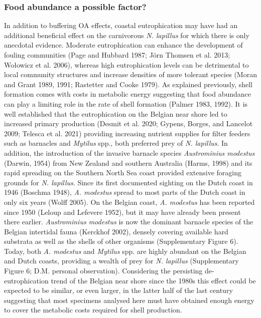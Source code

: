 \documentclass[smallextended]{svjour3}       %
\begin{document}
\hypertarget{food-abundance-a-possible-factor}{%
\subsubsection{Food abundance a possible
factor?}\label{food-abundance-a-possible-factor}}

In addition to buffering OA effects, coastal eutrophication may have had
an additional beneficial effect on the carnivorous \emph{N. lapillus}
for which there is only anecdotal evidence. Moderate eutrophication can
enhance the development of fouling communities (Page and Hubbard 1987;
Jörn Thomsen et al. 2013; Wołowicz et al. 2006), whereas high
eutrophication levels can be detrimental to local community structures
and increase densities of more tolerant species (Moran and Grant 1989,
1991; Rastetter and Cooke 1979). As explained previously, shell
formation comes with costs in metabolic energy suggesting that food
abundance can play a limiting role in the rate of shell formation
(Palmer 1983, 1992). It is well established that the eutrophication on
the Belgian near shore led to increased primary production (Desmit et
al. 2020; Gypens, Borges, and Lancelot 2009; Telesca et al. 2021)
providing increasing nutrient supplies for filter feeders such as
barnacles and \emph{Mytilus} spp., both preferred prey of \emph{N.
lapillus}. In addition, the introduction of the invasive barnacle
species \emph{Austrominius modestus} (Darwin, 1954) from New Zealand and
southern Australia (Harms, 1998) and its rapid spreading on the Southern
North Sea coast provided extensive foraging grounds for \emph{N.
lapillus}. Since its first documented sighting on the Dutch coast in
1946 (Boschma 1948), \emph{A. modestus} spread to most parts of the
Dutch coast in only six years (Wolff 2005). On the Belgian coast,
\emph{A. modestus} has been reported since 1950 (Leloup and Lefevere
1952), but it may have already been present there earlier.
\emph{Austrominius modestus} is now the dominant barnacle species of the
Belgian intertidal fauna (Kerckhof 2002), densely covering available
hard substrata as well as the shells of other organisms (Supplementary
Figure 6). Today, both \emph{A. modestus} and \emph{Mytilus} spp. are
highly abundant on the Belgian and Dutch coasts, providing a wealth of
prey for \emph{N. lapillus} (Supplementary Figure 6; D.M. personal
observation). Considering the persisting de-eutrophication trend of the
Belgian near shore since the 1980s this effect could be expected to be
similar, or even larger, in the latter half of the last century
suggesting that most specimens analysed here must have obtained enough
energy to cover the metabolic costs required for shell production.
\end{document}

